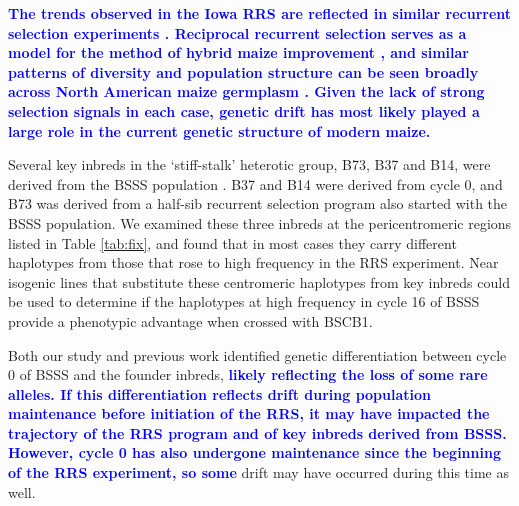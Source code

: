 \documentclass[twocolumn,twoside,letterpaper]{article}
\newcommand{\rev}[1]{\textcolor{blue}{\bf #1}}
\begin{document}
\rev{The trends observed in the Iowa RRS are reflected in similar recurrent selection experiments \citep{romay2012effect,lamkey2014relative}.
Reciprocal recurrent selection serves as a model for the method of hybrid maize improvement \citep{duvick2004long}, and similar patterns of diversity and population structure can be seen broadly across North American maize germplasm \citep{van2012historical}. 
Given the lack of strong selection signals in each case, genetic drift has most likely played a large role in the current genetic structure of modern maize. }	
	
Several key inbreds in the ‘stiff-stalk’ heterotic group, B73, B37 and B14, were derived from the BSSS population \citep{darrah1986, troyer1999background}. 
B37 and B14 were derived from cycle 0, and B73 was derived from a half-sib recurrent selection program also started with the BSSS population. 
We examined these three inbreds at the pericentromeric regions listed in Table \ref{tab:fix}, and found that in most cases they carry different haplotypes from those that rose to high frequency in the RRS experiment.  
Near isogenic lines that substitute these centromeric haplotypes from key inbreds could be used to determine if the haplotypes at high frequency in cycle 16 of BSSS provide a phenotypic advantage when crossed with BSCB1. 

Both our study and previous work \citep{labate1997molecular} identified genetic differentiation between cycle 0 of BSSS and the founder inbreds, \rev{likely reflecting the loss of some rare alleles.
If this differentiation reflects drift during population maintenance before initiation of the RRS, it may have impacted the trajectory of the RRS program and of key inbreds derived from BSSS. 
However, cycle 0 has also undergone maintenance since the beginning of the RRS experiment, so some} drift may have occurred during this time as well.
	
\end{document}
